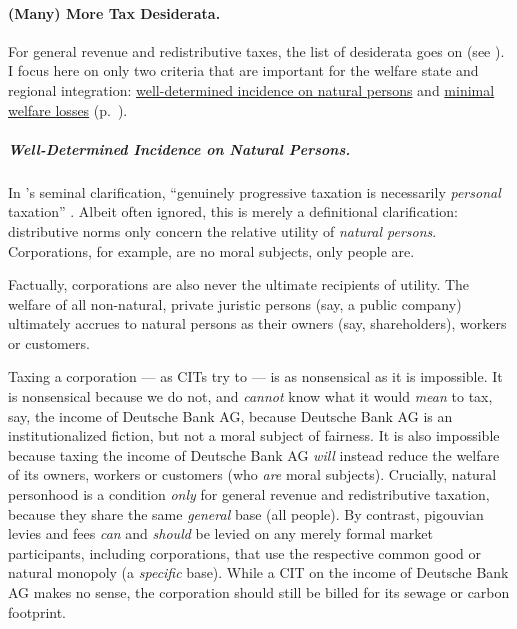 \paragraph[Tax Desiderata]{(Many) More Tax Desiderata.} For general revenue and redistributive taxes, the list of desiderata goes on (see \citealt{Held2010a}).
I focus here on only two criteria that are important for the welfare state and regional integration:
\hyperref[sec:well-determined-incidence]{well-determined incidence on natural persons} and \hyperref[sec:minimal-DWL]{minimal welfare losses} (p.~\pageref{sec:minimal-DWL}).

\subparagraph[Incidence]{Well-Determined Incidence on Natural Persons.} \label{sec:well-determined-incidence} In \citeauthor{Vickrey1947}'s seminal clarification, ``genuinely progressive taxation is necessarily \emph{personal} taxation'' \citeyearpar[1, emphasis added]{Vickrey1947}.
Albeit often ignored, this is merely a definitional clarification:
distributive norms only concern the relative utility of \emph{natural persons}.
Corporations, for example, are no moral subjects, only people are.

Factually, corporations are also never the ultimate recipients of utility.
The welfare of all non-natural, private juristic persons (say, a public company) ultimately accrues to natural persons as their owners (say, shareholders), workers or customers.

Taxing a corporation --- as \glspl{CIT} try to --- is as nonsensical as it is impossible.
It is nonsensical because we do not, and \emph{cannot} know what it would \emph{mean} to tax, say, the income of Deutsche Bank AG, because Deutsche Bank AG is an institutionalized fiction, but not a moral subject of fairness.
It is also impossible because taxing the income of Deutsche Bank AG \emph{will} instead reduce the welfare of its owners, workers or customers (who \emph{are} moral subjects).
Crucially, natural personhood is a condition \emph{only} for general revenue and redistributive taxation, because they share the same \emph{general} base (all people).
By contrast, pigouvian levies and fees \emph{can} and \emph{should} be levied on any merely formal market participants, including corporations, that use the respective common good or natural monopoly (a \emph{specific} base).
While a \gls{CIT} on the income of Deutsche Bank AG makes no sense, the corporation should still be billed for its sewage or carbon footprint.

